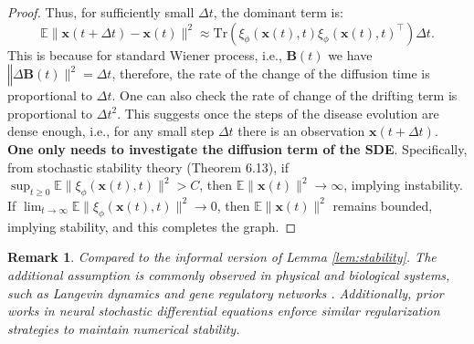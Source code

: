 \documentclass{article} %
\newtheorem{rem}{Remark}
\begin{document}
\begin{proof}
Thus, for sufficiently small \( \Delta t \), the dominant term is:
\begin{equation}
    \mathbb{E} \|\mathbf{x}{(t+\Delta t)} - \mathbf{x}(t)\|^2 \approx \text{Tr}(\xi_{\phi}(\mathbf{x}(t), t) \xi_{\phi}(\mathbf{x}(t), t)^\top) \Delta t.
\end{equation}
This is because for standard Wiener process, i.e., $\mathbf B(t)$ we have $\mathbb \|\Delta \mathbf B(t) \|^2 = \Delta t$, therefore, the rate of the change of the diffusion time is proportional to $\Delta t$. One can also check the rate of change of the drifting term is proportional to $\Delta t^2$. This suggests once the steps of the disease evolution are dense enough, i.e., for any small step $\Delta t$ there is an observation $\mathbf x(t+\Delta t)$. \textbf{One only needs to investigate the diffusion term of the SDE}. Specifically, 
from stochastic stability theory \citep{khasminskii2012stochastic} (Theorem 6.13), if \( \sup_{t \geq 0} \mathbb{E} \|\xi_{\phi}(\mathbf{x}(t), t)\|^2 > C \), then \( \mathbb{E} \|\mathbf{x}(t)\|^2 \to \infty \), implying instability. If \( \lim_{t \to \infty} \mathbb{E} \|\xi_{\phi}(\mathbf{x}(t), t)\|^2 \to 0 \), then \( \mathbb{E} \|\mathbf{x}(t)\|^2 \) remains bounded, implying stability, and this completes the graph. 
\end{proof}

\begin{rem}
Compared to the informal version of Lemma \ref{lem:stability}. The additional assumption is commonly observed in physical and biological systems, such as Langevin dynamics and gene regulatory networks \citep{elowitz2000synthetic}. Additionally, prior works in neural stochastic differential equations \citep{kidger2021neural} enforce similar regularization strategies to maintain numerical stability.
\end{rem}
\end{document}
